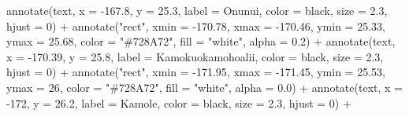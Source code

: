\documentclass[
]{article}
\newenvironment{Shaded}{\begin{snugshade}}{\end{snugshade}}
\newcommand{\AttributeTok}[1]{\textcolor[rgb]{0.77,0.63,0.00}{#1}}
\newcommand{\DecValTok}[1]{\textcolor[rgb]{0.00,0.00,0.81}{#1}}
\newcommand{\FloatTok}[1]{\textcolor[rgb]{0.00,0.00,0.81}{#1}}
\newcommand{\FunctionTok}[1]{\textcolor[rgb]{0.00,0.00,0.00}{#1}}
\newcommand{\NormalTok}[1]{#1}
\newcommand{\SpecialCharTok}[1]{\textcolor[rgb]{0.00,0.00,0.00}{#1}}
\newcommand{\StringTok}[1]{\textcolor[rgb]{0.31,0.60,0.02}{#1}}
\begin{document}
\begin{Shaded}
\begin{Highlighting}[]
  \FunctionTok{annotate}\NormalTok{(}\StringTok{\textquotesingle{}text\textquotesingle{}}\NormalTok{, }\AttributeTok{x =} \SpecialCharTok{{-}}\FloatTok{167.8}\NormalTok{, }\AttributeTok{y =} \FloatTok{25.3}\NormalTok{, }
           \AttributeTok{label =} \StringTok{\textquotesingle{}Onunui\textquotesingle{}}\NormalTok{, }\AttributeTok{color =} \StringTok{\textquotesingle{}black\textquotesingle{}}\NormalTok{, }\AttributeTok{size =} \FloatTok{2.3}\NormalTok{, }\AttributeTok{hjust =} \DecValTok{0}\NormalTok{) }\SpecialCharTok{+}
  \FunctionTok{annotate}\NormalTok{(}\StringTok{"rect"}\NormalTok{, }\AttributeTok{xmin =} \SpecialCharTok{{-}}\FloatTok{170.78}\NormalTok{, }\AttributeTok{xmax =} \SpecialCharTok{{-}}\FloatTok{170.46}\NormalTok{, }\AttributeTok{ymin =} \FloatTok{25.33}\NormalTok{, }\AttributeTok{ymax =} \FloatTok{25.68}\NormalTok{, }
           \AttributeTok{color =} \StringTok{"\#728A72"}\NormalTok{, }\AttributeTok{fill =} \StringTok{"white"}\NormalTok{, }\AttributeTok{alpha =} \FloatTok{0.2}\NormalTok{) }\SpecialCharTok{+}
  \FunctionTok{annotate}\NormalTok{(}\StringTok{\textquotesingle{}text\textquotesingle{}}\NormalTok{, }\AttributeTok{x =} \SpecialCharTok{{-}}\FloatTok{170.39}\NormalTok{, }\AttributeTok{y =} \FloatTok{25.8}\NormalTok{, }
           \AttributeTok{label =} \StringTok{\textquotesingle{}Kamokuokamohoalii\textquotesingle{}}\NormalTok{, }\AttributeTok{color =} \StringTok{\textquotesingle{}black\textquotesingle{}}\NormalTok{, }\AttributeTok{size =} \FloatTok{2.3}\NormalTok{, }\AttributeTok{hjust =} \DecValTok{0}\NormalTok{) }\SpecialCharTok{+}
  \FunctionTok{annotate}\NormalTok{(}\StringTok{"rect"}\NormalTok{, }\AttributeTok{xmin =} \SpecialCharTok{{-}}\FloatTok{171.95}\NormalTok{, }\AttributeTok{xmax =} \SpecialCharTok{{-}}\FloatTok{171.45}\NormalTok{, }\AttributeTok{ymin =} \FloatTok{25.53}\NormalTok{, }\AttributeTok{ymax =} \DecValTok{26}\NormalTok{, }
           \AttributeTok{color =} \StringTok{"\#728A72"}\NormalTok{, }\AttributeTok{fill =} \StringTok{"white"}\NormalTok{, }\AttributeTok{alpha =} \FloatTok{0.0}\NormalTok{) }\SpecialCharTok{+}
  \FunctionTok{annotate}\NormalTok{(}\StringTok{\textquotesingle{}text\textquotesingle{}}\NormalTok{, }\AttributeTok{x =} \SpecialCharTok{{-}}\DecValTok{172}\NormalTok{, }\AttributeTok{y =} \FloatTok{26.2}\NormalTok{, }
           \AttributeTok{label =} \StringTok{\textquotesingle{}Kamole\textquotesingle{}}\NormalTok{, }\AttributeTok{color =} \StringTok{\textquotesingle{}black\textquotesingle{}}\NormalTok{, }\AttributeTok{size =} \FloatTok{2.3}\NormalTok{, }\AttributeTok{hjust =} \DecValTok{0}\NormalTok{) }\SpecialCharTok{+}

\end{Highlighting}
\end{Shaded}
\end{document}
